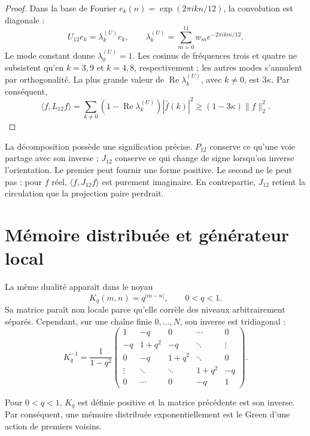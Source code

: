 \begin{proof}
Dans la base de Fourier
\(e_k(n)=\exp(2\pi ikn/12)\), la convolution est diagonale :
\[
 U_{12}e_k=\lambda_k^{(U)}e_k,\qquad
 \lambda_k^{(U)}=\sum_{m=0}^{11}w_m e^{-2\pi ikm/12}.
\]
Le mode constant donne \(\lambda_0^{(U)}=1\). Les cosinus de fréquences trois et
quatre ne subsistent qu'en \(k=3,9\) et \(k=4,8\), respectivement ; les autres
modes s'annulent par orthogonalité. La plus grande valeur de
\(\operatorname{Re}\lambda_k^{(U)}\), avec \(k\neq0\), est \(3\kappa\). Par conséquent,
\[
 \langle f,L_{12}f\rangle
 =\sum_{k\neq0}(1-\operatorname{Re}\lambda_k^{(U)})|\widehat f(k)|^2
 \geq(1-3\kappa)\|f\|_2^2.
\]
\end{proof}

La décomposition possède une signification précise. \(P_{12}\) conserve ce
qu'une voie partage avec son inverse ; \(J_{12}\) conserve ce qui change de
signe lorsqu'on inverse l'orientation. Le premier peut fournir une forme
positive. Le second ne le peut pas : pour \(f\) réel,
\(\langle f,J_{12}f\rangle\) est purement imaginaire. En contrepartie,
\(J_{12}\) retient la circulation que la projection paire perdrait.

\section{Mémoire distribuée et générateur local}

La même dualité apparaît dans le noyau
\[
 K_q(m,n)=q^{|m-n|},\qquad 0<q<1.
\]
Sa matrice paraît non locale parce qu'elle corrèle des niveaux arbitrairement
séparés. Cependant, sur une chaîne finie \(0,\ldots,N\), son inverse
est tridiagonal :
\[
 K_q^{-1}
 =\frac1{1-q^2}
 \begin{pmatrix}
 1&-q&0&\cdots&0\\
 -q&1+q^2&-q&\ddots&\vdots\\
 0&-q&1+q^2&\ddots&0\\
 \vdots&\ddots&\ddots&1+q^2&-q\\
 0&\cdots&0&-q&1
 \end{pmatrix}.
\]

\begin{proposition}
\label{prop:green-local-memoria-rev6}
Pour \(0<q<1\), \(K_q\) est définie positive et la matrice précédente est son
inverse. Par conséquent, une mémoire distribuée exponentiellement est le
Green d'une action de premiers voisins.
\end{proposition}

